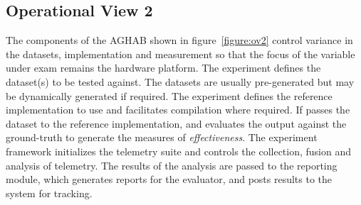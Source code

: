 \begin{figure*}
    \centering
    
    \caption{The Experiment Framework reads the experiment specification, collects the specified datasets, and reference implementations and creates an experiment to task the baseline CPU, GPU and Graph Hardware Accelerators (GHA). It controls the data collection and report generation.}
    \label{figure:ov2}
\end{figure*}

\subsection{Operational View 2}
The components of the AGHAB shown in figure~\ref{figure:ov2} control variance in the datasets, implementation and measurement so that the focus of the variable under exam remains the hardware platform. 
The experiment defines the dataset(s) to be tested against.
The datasets are usually pre-generated but may be dynamically generated if required. 
The experiment defines the reference implementation to use and facilitates compilation where required.
If passes the dataset to the reference implementation, and evaluates the output against the ground-truth to generate the measures of \textit{effectiveness}.
The experiment framework initializes the telemetry suite and controls the collection, fusion and analysis of telemetry. 
The results of the analysis are passed to the reporting module, which generates reports for the evaluator, and posts results to the system for tracking. 



